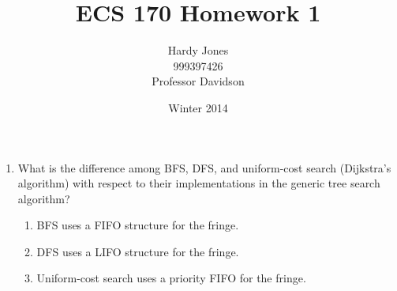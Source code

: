 \documentclass[12pt,letterpaper]{article}
\title{ECS 170 Homework 1\vspace{-2ex}}
\author{Hardy Jones\\
        999397426\\
        Professor Davidson\vspace{-2ex}}
\date{Winter 2014}
\begin{document}
  \maketitle

  \begin{enumerate}
    \item
      What is the difference among
      BFS, DFS, and uniform-cost search (Dijkstra's algorithm)
      with respect to their implementations in the generic tree search algorithm?

      \begin{enumerate}
        \item BFS uses a FIFO structure for the fringe.
        \item DFS uses a LIFO structure for the fringe.
        \item Uniform-cost search uses a priority FIFO for the fringe.
      \end{enumerate}
  \end{enumerate}
\end{document}
